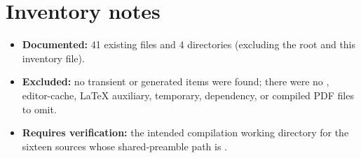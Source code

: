 \section{Inventory notes}

\begin{itemize}
\item \textbf{Documented:} 41 existing files and 4 directories (excluding the  root and this inventory file).
\item \textbf{Excluded:} no transient or generated items were found; there were no , editor-cache, LaTeX auxiliary, temporary, dependency, or compiled PDF files to omit.
\item \textbf{Requires verification:} the intended compilation working directory for the sixteen sources whose shared-preamble path is .
\end{itemize}

